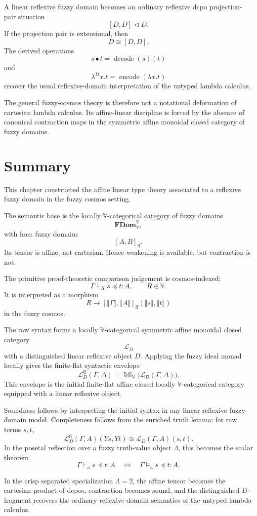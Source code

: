 A linear reflexive fuzzy domain becomes an ordinary reflexive dcpo
projection-pair situation
\[
    [D,D]\triangleleft D.
\]
If the projection pair is extensional, then
\[
    D\cong [D,D].
\]
The derived operations
\[
    s\bullet t
    =
    \operatorname{decode}(s)(t)
\]
and
\[
    \lambda^D x.t
    =
    \operatorname{encode}(\lambda x.t)
\]
recover the usual reflexive-domain interpretation of the untyped lambda
calculus.

The general fuzzy-cosmos theory is therefore not a notational deformation of
cartesian lambda calculus.  Its affine-linear discipline is forced by the
absence of canonical contraction maps in the symmetric affine monoidal closed
category of fuzzy domains.

\section{Summary}
\label{sec:summary-affine-linear-type-theory}

This chapter constructed the affine linear type theory associated to a
reflexive fuzzy domain in the fuzzy cosmos setting.

The semantic base is the locally \(\mathbb V\)-categorical category of fuzzy
domains
\[
    \mathbf{FDom}_{\mathbb V}^{\mathbb V},
\]
with hom fuzzy domains
\[
    [A,B]_{\mathrm{ff}}.
\]
Its tensor is affine, not cartesian.  Hence weakening is available, but
contraction is not.

The primitive proof-theoretic comparison judgement is cosmos-indexed:
\[
    \Gamma\vdash_R s\preceq t:A,
    \qquad
    R\in\mathbb V.
\]
It is interpreted as a morphism
\[
    R
    \longrightarrow
    [\llbracket \Gamma\rrbracket,
     \llbracket A\rrbracket]_{\mathrm{ff}}
    (\llbracket s\rrbracket,\llbracket t\rrbracket)
\]
in the fuzzy cosmos.

The raw syntax forms a locally \(\mathbb V\)-categorical symmetric affine
monoidal closed category
\[
    \mathcal L_D
\]
with a distinguished linear reflexive object \(D\).  Applying the fuzzy ideal
monad locally gives the finite-flat syntactic envelope
\[
    \mathcal L_D^{\mathrm{ff}}(\Gamma,\Delta)
    =
    \operatorname{Idl}_{\mathbb V}
    \bigl(\mathcal L_D(\Gamma,\Delta)\bigr).
\]
This envelope is the initial finite-flat affine closed locally
\(\mathbb V\)-categorical category equipped with a linear reflexive object.

Soundness follows by interpreting the initial syntax in any linear reflexive
fuzzy-domain model.  Completeness follows from the enriched truth lemma:
for raw terms \(s,t\),
\[
    \mathcal L_D^{\mathrm{ff}}(\Gamma,A)(Ys,Yt)
    \cong
    \mathcal L_D(\Gamma,A)(s,t).
\]
In the posetal reflection over a fuzzy truth-value object \(\Lambda\), this
becomes the scalar theorem
\[
    \Gamma\vdash_a s\preceq t:A
    \quad\Longleftrightarrow\quad
    \Gamma\models_a s\preceq t:A.
\]

In the crisp separated specialization \(\Lambda=2\), the affine tensor becomes
the cartesian product of dcpos, contraction becomes sound, and the
distinguished \(D\)-fragment recovers the ordinary reflexive-domain semantics
of the untyped lambda calculus.